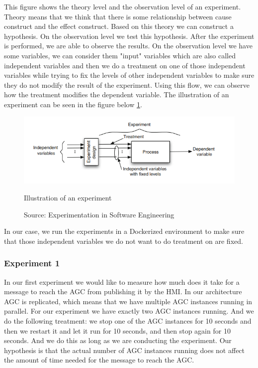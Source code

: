 This figure shows the theory level and the observation level of an experiment. Theory means that we think that there is some relationship between cause construct and the effect construct. Based on this theory we can construct a hypothesis. On the observation level we test this hypothesis. After the experiment is performed, we are able to observe the results. On the observation level we have some variables, we can consider them "input" variables which are also called independent variables and then we do a treatment on one of those independent variables while trying to fix the levels of other independent variables to make sure they do not modify the result of the experiment. Using this flow, we can observe how the treatment modifies the dependent variable. The illustration of an experiment can be seen in the figure below \ref{fig:experiment_illustration}.

\begin{figure}[ht]
\centering
  \includegraphics[width=\linewidth]{images/experiment_illustration.png}
  \caption{Illustration of an experiment}
  \caption*{Source: Experimentation in Software Engineering}
  \cite{experimentationInSoftwareEngineering}
  \label{fig:experiment_illustration}
\end{figure}

In our case, we run the experiments in a Dockerized environment to make sure that those independent variables we do not want to do treatment on are fixed.

\subsubsection{Experiment 1}
\label{sec:experiment_1}
In our first experiment we would like to measure how much does it take for a message to reach the AGC from publishing it by the HMI. In our architecture AGC is replicated, which means that we have multiple AGC instances running in parallel. For our experiment we have exactly two AGC instances running. And we do the following treatment: we stop one of the AGC instances for 10 seconds and then we restart it and let it run for 10 seconds, and then stop again for 10 seconds. And we do this as long as we are conducting the experiment. Our hypothesis is that the actual number of AGC instances running does not affect the amount of time needed for the message to reach the AGC.


